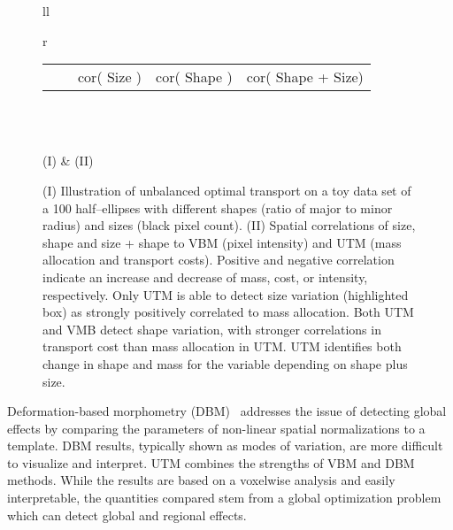 \documentclass{llncs}
\begin{document}
\begin{figure}[t!]
\begin{tabular}{ll}
\begin{tabular}{r}
\begin{tabular}{rl|ccc}
  \raisebox{-2mm}{\texttt{[image: cor-rx-ry-mass]} }&
  \raisebox{-2mm}{\texttt{[image: cor-rx-ry-mass-mass]} }\\ \hline 
  &
  & cor( Size ) 
  & cor( Shape )
  & cor( Shape + Size)
\end{tabular}\\
\end{tabular}\\
  (I) & (II) \\
\end{tabular}
\caption{\label{fig:cor-ellipse}
(I) Illustration of unbalanced optimal transport on a toy data set of a 100
half--ellipses with different shapes (ratio of major to minor radius) and sizes
(black pixel count).  (II) Spatial correlations of size, shape and
size + shape to VBM (pixel intensity) and UTM (mass allocation
and transport costs).  Positive and negative correlation indicate an
increase and decrease of mass, cost, or intensity, respectively. Only UTM is
able to detect size variation (highlighted box) as strongly positively
correlated to mass allocation.  Both UTM and VMB detect shape variation,
with stronger correlations in transport cost than mass allocation in UTM. UTM
identifies both change in shape and mass for the variable depending on shape
plus size. 
\vspace{-7mm}
}
\end{figure}

Deformation-based morphometry (DBM)~\cite{ashburner1998identifying} addresses
the issue of detecting global effects by comparing the parameters of non-linear
spatial normalizations to a template.  DBM results, typically shown as modes of
variation, are more difficult to visualize and interpret.  UTM combines the
strengths of VBM and DBM methods.  While the results are based on a voxelwise
analysis and easily interpretable, the quantities compared stem from a global
optimization problem which can detect global and regional effects.  
\end{document}
